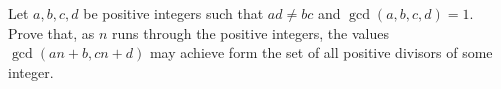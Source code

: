 Let $a,b,c,d$ be positive integers such that $ad\neq bc$ and $\gcd\left(a,b,c,d\right)=1$. Prove that, as $n$ runs through the positive integers, the values $\gcd\left(an+b,cn+d\right)$ may achieve form the set of all positive divisors of some integer.
